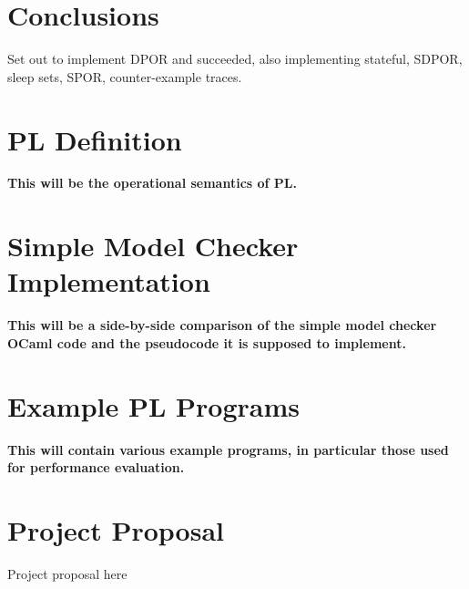 \documentclass[12pt,a4paper,twoside,openright]{report}
\begin{document}
\chapter{Conclusions}

Set out to implement DPOR and succeeded, also implementing
stateful, SDPOR, sleep sets, SPOR, counter-example traces.




\appendix

\chapter{PL Definition}
\label{app:pl-def}
 
\textbf{This will be the operational semantics
	of PL.}

\chapter{Simple Model Checker Implementation}
\label{app:simple-code}

\textbf{This will be a side-by-side comparison
	of the simple model checker OCaml code and
	the pseudocode it is supposed to implement.}
 
\chapter{Example PL Programs}

\textbf{This will contain various
	example programs, in particular
	those used for performance evaluation.}

\chapter{Project Proposal}

Project proposal here
% 
\end{document}
